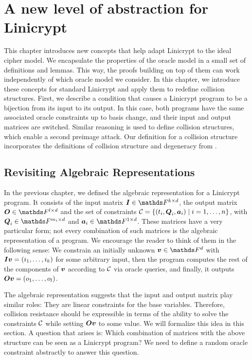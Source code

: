 \chapter{A new level of abstraction for Linicrypt}

This chapter introduces new concepts that help adapt Linicrypt to the ideal cipher model.
We encapsulate the properties of the oracle model in a small set of definitions and lemmas.
This way, the proofs building on top of them can work independently of which oracle model we consider.
In this chapter, we introduce these concepts for standard Linicrypt and apply them to redefine collision structures.
First, we describe a condition that causes a Linicrypt program to be a bijection from its input to its output. 
In this case, both programs have the same associated oracle constraints up to basis change, and their input and output matrices are switched.
Similar reasoning is used to define collision structures, which enable a second preimage attack.
Our definition for a collision structure incorporates the definitions of collision structure and degeneracy from \cite{TCC:McQSwoRos19}.

\section{Revisiting Algebraic Representations}
\label{chapter:revisiting_algebraic_representations}

In the previous chapter, we defined the algebraic representation for a Linicrypt program.
It consists of the input matrix $\Inp \in \F^{k \times \base}$,
the output matrix $\O \in \F^{l \times \base}$
and the set of constraints $\mathcal{C} = \{ (t_i, \boldsymbol{Q}_i, \boldsymbol a_i) \mid i = 1, \dots, n \}$,
with $\Q_i \in \F^{m_i \times \base}$ and $\va_i \in \F^{1 \times \base}$.
These matrices have a very particular form; not every combination of such matrices is the algebraic representation of a program.
We encourage the reader to think of them in the following sense:
We constrain an initially unknown $\vv \in \Fsp$ with $\boldsymbol{I}\boldsymbol v = (i_1, \dots, i_{k})$ for some arbitrary input,
then the program computes the rest of the components of $\boldsymbol v$ according to $\mathcal{C}$ via oracle queries, and finally, it outputs $\boldsymbol{O} \boldsymbol v = (o_1, \dots, o_{l})$.

The algebraic representation suggests that the input and output matrix play similar roles:
They are linear constraints for the base variables. 
Therefore, collision resistance should be expressible in terms of the ability to solve the constraints $\mathcal{C}$ while setting $\boldsymbol{O}\boldsymbol v$ to some value.  
We will formalize this idea in this section.
A question that arises is:
Which combination of matrices with the above structure can be seen as a Linicrypt program?
We need to define a random oracle constraint abstractly to answer this question.

